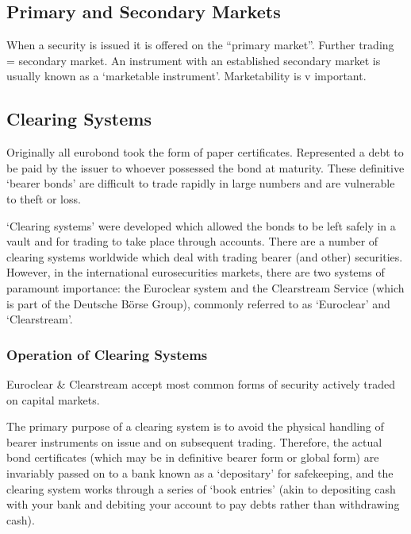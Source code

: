 \documentclass[
]{article}
\begin{document}
\hypertarget{primary-and-secondary-markets}{%
\subsection{Primary and Secondary
Markets}\label{primary-and-secondary-markets}}

When a security is issued it is offered on the ``primary market''.
Further trading = secondary market. An instrument with an established
secondary market is usually known as a `marketable instrument'.
Marketability is v important.

\hypertarget{clearing-systems}{%
\subsection{Clearing Systems}\label{clearing-systems}}

Originally all eurobond took the form of paper certificates. Represented
a debt to be paid by the issuer to whoever possessed the bond at
maturity. These definitive `bearer bonds' are difficult to trade rapidly
in large numbers and are vulnerable to theft or loss.

`Clearing systems' were developed which allowed the bonds to be left
safely in a vault and for trading to take place through accounts. There
are a number of clearing systems worldwide which deal with trading
bearer (and other) securities. However, in the international
eurosecurities markets, there are two systems of paramount importance:
the Euroclear system and the Clearstream Service (which is part of the
Deutsche Börse Group), commonly referred to as `Euroclear' and
`Clearstream'.

\hypertarget{operation-of-clearing-systems}{%
\subsubsection{Operation of Clearing
Systems}\label{operation-of-clearing-systems}}

Euroclear \& Clearstream accept most common forms of security actively
traded on capital markets.

The primary purpose of a clearing system is to avoid the physical
handling of bearer instruments on issue and on subsequent trading.
Therefore, the actual bond certificates (which may be in definitive
bearer form or global form) are invariably passed on to a bank known as
a `depositary' for safekeeping, and the clearing system works through a
series of `book entries' (akin to depositing cash with your bank and
debiting your account to pay debts rather than withdrawing cash).
\end{document}
